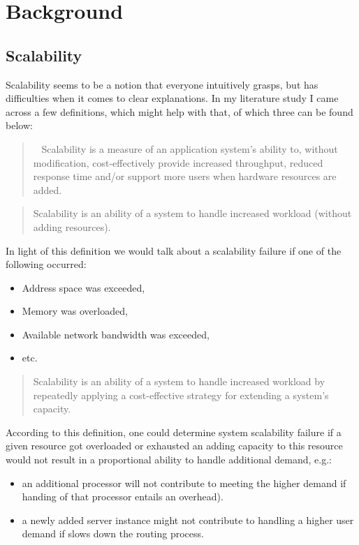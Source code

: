 \documentclass{uvamscse}
\begin{document}

\chapter{Background}\label{Background}

\section{Scalability}\label{Scalability}

Scalability seems to be a notion that everyone intuitively grasps, but has difficulties when it comes to clear explanations. In my literature study I came across a few definitions, which might help with that, of which three can be found below:

\begin{quote}
~\cite{Williams04} Scalability is a measure of an application system’s ability to, without modification, cost-effectively provide increased throughput, reduced response time and/or support more users when hardware resources are added.
\end{quote}

\begin{quote}
\cite{WeinstockOnSystem2006} Scalability is an ability of a system to handle increased workload (without adding resources).
\end{quote}\label{x}
In light of this definition we would talk about a scalability failure if one of the following occurred:
\begin{itemize}
  \item Address space was exceeded,
  \item Memory was overloaded,
  \item Available network bandwidth was exceeded,
  \item etc.
\end{itemize}

\begin{quote}
\cite{WeinstockOnSystem2006} Scalability is an ability of a system to handle increased workload by repeatedly applying a cost-effective strategy for extending a system’s capacity.
\end{quote}
According to this definition, one could determine system scalability failure if a given resource got overloaded or exhausted an adding capacity to this resource would not result in a proportional ability to handle additional demand, e.g.:
\begin{itemize}
  \item an additional processor will not contribute to meeting the higher demand if handing of that processor entails an overhead).
  \item a newly added server instance might not contribute to handling a higher user demand if slows down the routing process.
\end{itemize}
\end{document}
